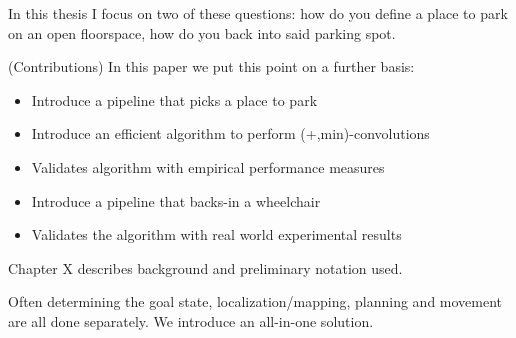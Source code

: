 In this thesis I focus on two of these questions: how do you define a place to
park on an open floorspace, how do you back into said parking spot.

(Contributions) In this paper we put this point on a further basis:
\begin{itemize}
\item Introduce a pipeline that picks a place to park
\item Introduce an efficient algorithm to perform (+,min)-convolutions
\item Validates algorithm with empirical performance measures
\item Introduce a pipeline that backs-in a wheelchair
\item Validates the algorithm with real world experimental results
\end{itemize}

Chapter X describes background and preliminary notation used.

Often determining the goal state, localization/mapping, planning and movement
are all done separately. We introduce an all-in-one solution.



\endinput
Any text after an \endinput is ignored.

\section{Summary of Thesis}
\subsection{One sentence summary}
We introduce an autonomous back-in parking system for powered wheelchairs
equipped with an RGB-D sensor, that finds a suitable place to park in a room
without any marked parking spots.

\subsection{One paragraph summary}
We address the problem: Where

\subsection{Five minute read summary}

\paragraph{What is this?} A collection of research ideas.

\paragraph{Who's it for?} Me.

TODO use this \cite{viswanathan2011navigation}
